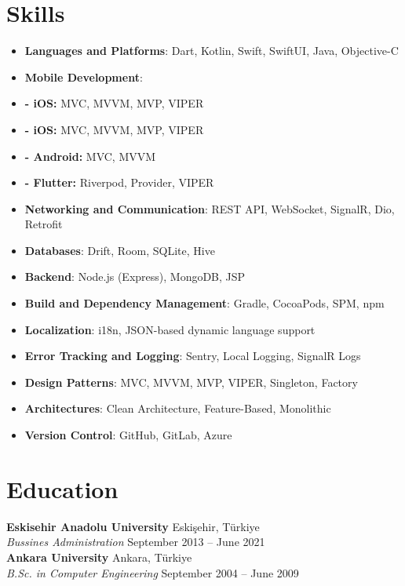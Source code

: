 \documentclass[10pt,a4paper]{extarticle}
\begin{document}
\section{Skills}
\begin{itemize}[leftmargin=*,noitemsep,topsep=0pt]
	\item \textbf{Languages and Platforms}: Dart, Kotlin, Swift, SwiftUI, Java, Objective-C
	\item \textbf{Mobile Development}: 
 	\item \textbf{- iOS:} MVC, MVVM, MVP, VIPER 
  	\item \textbf{- iOS:} MVC, MVVM, MVP, VIPER 
  	\item \textbf{- Android:} MVC, MVVM
  	\item \textbf{- Flutter:} Riverpod, Provider, VIPER
	\item \textbf{Networking and Communication}: REST API, WebSocket, SignalR, Dio, Retrofit
	\item \textbf{Databases}: Drift, Room, SQLite, Hive
	\item \textbf{Backend}: Node.js (Express), MongoDB, JSP
	\item \textbf{Build and Dependency Management}: Gradle, CocoaPods, SPM, npm
	\item \textbf{Localization}: i18n, JSON-based dynamic language support
	\item \textbf{Error Tracking and Logging}: Sentry, Local Logging, SignalR Logs
	\item \textbf{Design Patterns}: MVC, MVVM, MVP, VIPER, Singleton, Factory
	\item \textbf{Architectures}: Clean Architecture, Feature-Based, Monolithic
	\item \textbf{Version Control}: GitHub, GitLab, Azure
\end{itemize}
\section{Education}
\textbf{Eskisehir Anadolu University} \hfill Eskişehir, Türkiye\\
\textit{Bussines Administration} \hfill September 2013 -- June 2021\\
\textbf{Ankara University} \hfill Ankara, Türkiye\\
\textit{B.Sc. in Computer Engineering} \hfill September 2004 -- June 2009\\
\end{document}
